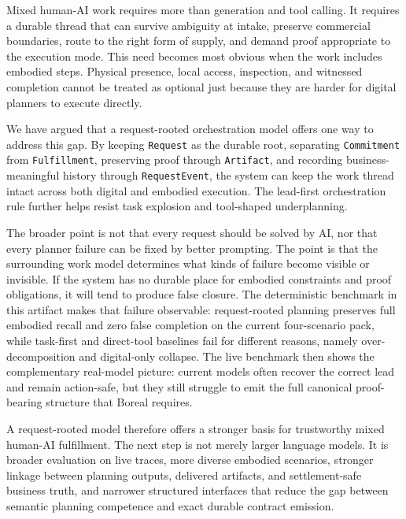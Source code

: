 Mixed human-AI work requires more than generation and tool calling. It requires a durable thread that can survive ambiguity at intake, preserve commercial boundaries, route to the right form of supply, and demand proof appropriate to the execution mode. This need becomes most obvious when the work includes embodied steps. Physical presence, local access, inspection, and witnessed completion cannot be treated as optional just because they are harder for digital planners to execute directly.

We have argued that a request-rooted orchestration model offers one way to address this gap. By keeping \texttt{Request} as the durable root, separating \texttt{Commitment} from \texttt{Fulfillment}, preserving proof through \texttt{Artifact}, and recording business-meaningful history through \texttt{RequestEvent}, the system can keep the work thread intact across both digital and embodied execution. The lead-first orchestration rule further helps resist task explosion and tool-shaped underplanning.

The broader point is not that every request should be solved by AI, nor that every planner failure can be fixed by better prompting. The point is that the surrounding work model determines what kinds of failure become visible or invisible. If the system has no durable place for embodied constraints and proof obligations, it will tend to produce false closure. The deterministic benchmark in this artifact makes that failure observable: request-rooted planning preserves full embodied recall and zero false completion on the current four-scenario pack, while task-first and direct-tool baselines fail for different reasons, namely over-decomposition and digital-only collapse. The live benchmark then shows the complementary real-model picture: current models often recover the correct lead and remain action-safe, but they still struggle to emit the full canonical proof-bearing structure that Boreal requires.

A request-rooted model therefore offers a stronger basis for trustworthy mixed human-AI fulfillment. The next step is not merely larger language models. It is broader evaluation on live traces, more diverse embodied scenarios, stronger linkage between planning outputs, delivered artifacts, and settlement-safe business truth, and narrower structured interfaces that reduce the gap between semantic planning competence and exact durable contract emission.
